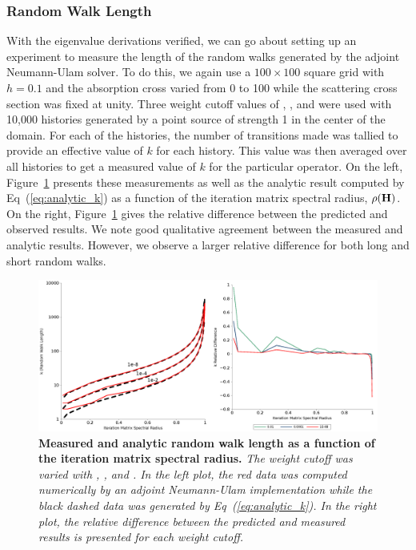 \subsubsection{Random Walk Length}
\label{subsubsec:walk_length}
With the eigenvalue derivations verified, we can go about setting up
an experiment to measure the length of the random walks generated by
the adjoint Neumann-Ulam solver. To do this, we again use a $100
\times 100$ square grid with $h=0.1$ and the absorption cross varied
from 0 to 100 while the scattering cross section was fixed at
unity. Three weight cutoff values of , , and
 were used with 10,000 histories generated by a point source
of strength 1 in the center of the domain. For each of the histories,
the number of transitions made was tallied to provide an effective
value of $k$ for each history. This value was then averaged over all
histories to get a measured value of $k$ for the particular
operator. On the left, Figure~\ref{fig:measured_length} presents these
measurements as well as the analytic result computed by
Eq~(\ref{eq:analytic_k}) as a function of the iteration matrix
spectral radius, $\rho(\mathbf{H})$. On the right,
Figure~\ref{fig:measured_length} gives the relative difference between the
predicted and observed results. We note good qualitative agreement
between the measured and analytic results. However, we observe a
larger relative difference for both long and short random walks.
\begin{figure}[t!]
  \begin{spacing}{1.0}
    \begin{center}
      \includegraphics[width=6.0in,clip]{chapters/parallel_mc/measured_length_2.pdf}
    \end{center}
    \caption{\textbf{Measured and analytic random walk length as a
        function of the iteration matrix spectral radius.} \textit{The
        weight cutoff was varied with , , and
        . In the left plot, the red data was computed
        numerically by an adjoint Neumann-Ulam implementation while
        the black dashed data was generated by
        Eq~(\ref{eq:analytic_k}). In the right plot, the relative
        difference between the predicted and measured results is
        presented for each weight cutoff.}}
    \label{fig:measured_length}
  \end{spacing}
\end{figure}

